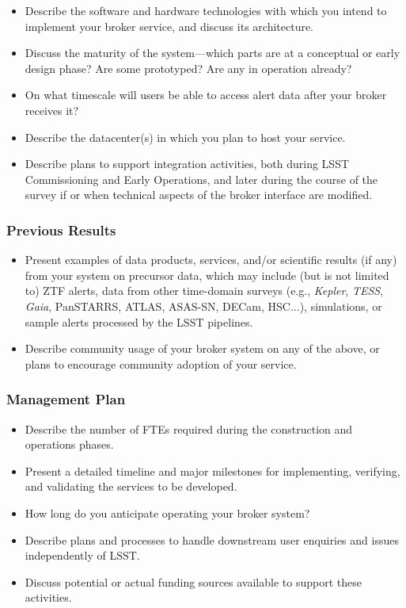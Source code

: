 \documentclass[DM,toc,lsstdraft]{lsstdoc}
\begin{document}
\begin{itemize}
\item Describe the software and hardware technologies with which you intend to implement your broker service, and discuss its architecture.
\item Discuss the maturity of the system---which parts are at a conceptual or early design phase?  Are some prototyped? Are any in operation already?
\item On what timescale will users be able to access alert data after your broker receives it?
\item Describe the datacenter(s) in which you plan to host your service.
\item Describe plans to support integration activities,  both during LSST Commissioning and Early Operations,  and later during the course of the survey if or when technical aspects of the broker interface are modified.
\end{itemize}


\subsubsection{Previous Results}

\begin{itemize}
\item Present examples of data products, services, and/or scientific results (if any) from your system on precursor data, which may include (but is not limited to) ZTF alerts, data from other time-domain surveys (e.g., \textit{Kepler}, \textit{TESS}, \textit{Gaia}, PanSTARRS, ATLAS, ASAS-SN, DECam, HSC...), simulations, or sample alerts processed by the LSST pipelines.
\item Describe community usage of your broker system on any of the above, or plans to encourage community adoption of your service.
\end{itemize}
	
\subsubsection{Management Plan}

\begin{itemize}
\item Describe the number of FTEs required during the construction and operations phases.
\item Present a detailed timeline and major milestones for implementing, verifying, and validating the services to be developed.
\item How long do you anticipate operating your broker system?
\item Describe plans and processes to handle downstream user enquiries and issues independently of LSST.
\item Discuss potential or actual funding sources available to support these activities.	
\end{itemize}
\end{document}
